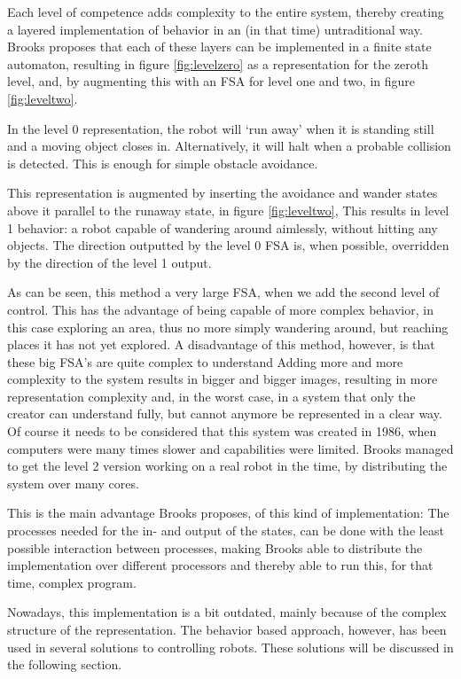 \documentclass[a4paper,10pt]{article}
\begin{document}
Each level of competence adds complexity to the entire system, thereby creating
a layered implementation of behavior in an (in that time) untraditional way.
Brooks proposes that each of these layers can be implemented in a finite state
automaton, resulting in figure \ref{fig:levelzero} as a representation for the
zeroth level, and, by augmenting this with an FSA for level one and two, in
figure \ref{fig:leveltwo}.

In the level 0 representation, the robot will `run away' when it is standing
still and a moving object closes in. Alternatively, it will halt when a probable
collision is detected. This is enough for simple obstacle avoidance.

This representation is augmented by inserting the avoidance and wander states
above it parallel to the runaway state, in figure \ref{fig:leveltwo},
This results in level 1 behavior: a robot capable of
wandering around aimlessly, without hitting any objects. The direction outputted
by the level 0 FSA is, when possible, overridden by the direction of the level 1
output. 

As can be seen, this method a very large FSA, when we add the second level of
control. This has the advantage of being capable of more complex behavior, in
this case exploring an area, thus no more simply wandering around, but reaching
places it has not yet explored. A disadvantage of this method, however, is that
these big FSA's are quite complex to understand Adding more and more complexity
to the system results in bigger and bigger images, resulting in more
representation complexity and, in the worst case, in a system that only the
creator can understand fully, but cannot anymore be represented in a clear way.
Of course it needs to be considered that this system was created in 1986, when
computers were many times slower and capabilities were limited. Brooks managed
to get the level 2 version working on a real robot in the time, by distributing
the system over many cores.

This is the main advantage Brooks proposes, of this kind of implementation: The
processes needed for the in- and output of the states, can be done with the
least possible interaction between processes, making Brooks able to distribute
the implementation over different processors and thereby able to run this, for
that time, complex program.

Nowadays, this implementation is a bit outdated, mainly because of the complex
structure of the representation. The behavior based approach, however, has been
used in several solutions to controlling robots. These solutions will be
discussed in the following section.
\end{document}
